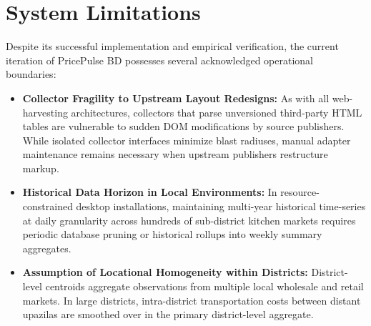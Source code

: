 \section{System Limitations}
Despite its successful implementation and empirical verification, the current iteration of PricePulse BD possesses several acknowledged operational boundaries:
\begin{itemize}
    \item \textbf{Collector Fragility to Upstream Layout Redesigns:} As with all web-harvesting architectures, collectors that parse unversioned third-party HTML tables are vulnerable to sudden DOM modifications by source publishers. While isolated collector interfaces minimize blast radiuses, manual adapter maintenance remains necessary when upstream publishers restructure markup.
    \item \textbf{Historical Data Horizon in Local Environments:} In resource-constrained desktop installations, maintaining multi-year historical time-series at daily granularity across hundreds of sub-district kitchen markets requires periodic database pruning or historical rollups into weekly summary aggregates.
    \item \textbf{Assumption of Locational Homogeneity within Districts:} District-level centroids aggregate observations from multiple local wholesale and retail markets. In large districts, intra-district transportation costs between distant upazilas are smoothed over in the primary district-level aggregate.
\end{itemize}

